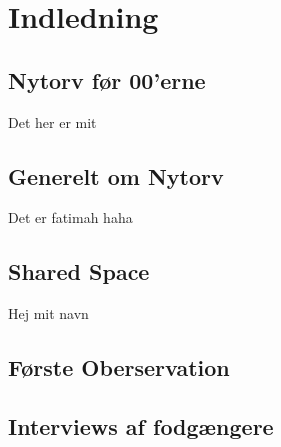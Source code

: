 \chapter{Indledning}
\label{chap:Indledning}

\section{Nytorv før 00'erne}
\label{sec:Nytorv før 00'erne}
Det her er mit
\section{Generelt om Nytorv}
\label{sec:Generelt om Nytorv}
Det er fatimah haha
\section{Shared Space}
\label{sec:Shared Space}
Hej mit navn \cite {datasheet_pir1}
\section{Første Oberservation}
\label{sec:Første Oberservation}

\section{Interviews af fodgængere}
\label{sec:Interviews af fodgængere}
